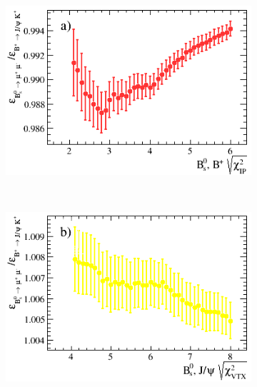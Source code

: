 \begin{figure}[htbp]
    \centering
    \begin{subfigure}[b]{0.48\textwidth}
        \includegraphics[width=\textwidth]{./Figs/Selection/BsMuMu_JPsiK_IP.png}
        \label{fig:IPS_ratio}
    \end{subfigure}
    ~ %
    \begin{subfigure}[b]{0.48\textwidth}
        \includegraphics[width=\textwidth]{./Figs/Selection/BsMuMu_JpsiK_vertex.png}
        \label{fig:CHI2_ratio}
    \end{subfigure}
    ~ %


\end{figure}
